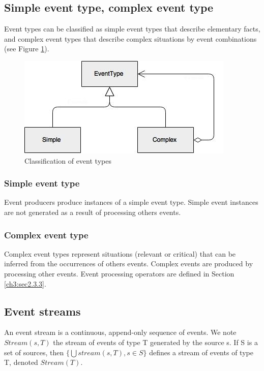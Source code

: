  \subsection{Simple event type, complex event type}
Event types can be classified as simple event types that describe elementary facts, and complex event types that describe complex situations by event combinations (see Figure \ref{fig:eventtype}). 
\begin{figure}[H]
  \begin{center}
    \includegraphics[scale=0.5]{chap3/images/eventType.jpg}
  \end{center}
  \caption{Classification of event types}
  \label{fig:eventtype}
\end{figure}

\subsubsection{Simple event type}
Event producers produce instances of a simple event type. Simple event instances are not generated as a result of processing others events.

\subsubsection{Complex event type}
\label{ch3:sec2.3.2}
Complex event types represent situations (relevant or critical) that can be inferred from the occurrences of others events. Complex events are produced by processing other events. Event processing operators are defined in Section \ref{ch3:sec2.3.3}.

\subsection{Event streams}
 An event stream is a continuous, append-only sequence of events. We note $Stream(s, T)$ the stream of events of type T generated by the source s. If S is a set of sources, then $\{\bigcup  stream(s,T), s \in S\}$ defines a stream of events of type T, denoted $Stream(T)$.
 
